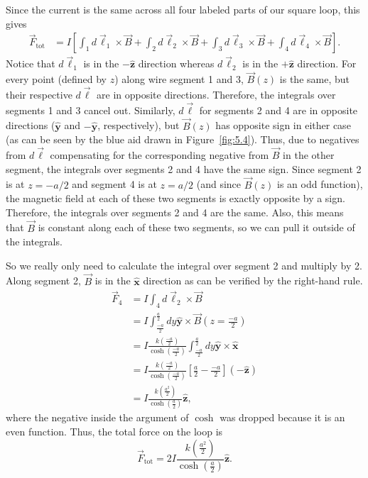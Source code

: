 \documentclass{article}
\newcommand{\xhat}{\hat{\textbf{x}}}
\newcommand{\yhat}{\hat{\textbf{y}}}
\newcommand{\zhat}{\hat{\textbf{z}}}
\begin{document}
Since the current is the same across all four labeled parts of our square loop, this gives
\begin{align}
	\vec{F}_\textrm{tot} &= I\left[ \int_1d\vec{\ell}_1\times\vec{B} + \int_2d\vec{\ell}_2\times\vec{B} + \int_3d\vec{\ell}_3\times\vec{B} + \int_4d\vec{\ell}_4\times\vec{B} \right].
\end{align}
Notice that $d\vec{\ell}_1$ is in the $-\zhat$ direction whereas $d\vec{\ell}_2$ is in the $+\zhat$ direction. For every point (defined by $z$) along wire segment 1 and 3, $\vec{B}(z)$ is the same, but their respective $d\vec{\ell}$ are in opposite directions. Therefore, the integrals over segments 1 and 3 cancel out. Similarly, $d\vec{\ell}$ for segments 2 and 4 are in opposite directions ($\yhat$ and $-\yhat$, respectively), but $\vec{B}(z)$ has opposite sign in either case (as can be seen by the blue aid drawn in Figure~\ref{fig:5.4}). Thus, due to negatives from $d\vec{\ell}$ compensating for the corresponding negative from $\vec{B}$ in the other segment, the integrals over segments 2 and 4 have the same sign. Since segment 2 is at $z=-a/2$ and segment 4 is at $z=a/2$ (and since $\vec{B}(z)$ is an odd function), the magnetic field at each of these two segments is exactly opposite by a sign. Therefore, the integrals over segments 2 and 4 are the same. Also, this means that $\vec{B}$ is constant along each of these two segments, so we can pull it outside of the integrals.

So we really only need to calculate the integral over segment 2 and multiply by 2. Along segment 2, $\vec{B}$ is in the $\xhat$ direction as can be verified by the right-hand rule.
\begin{align}
	\vec{F}_4 &= I \int_4d\vec{\ell}_2\times\vec{B} \\
	&= I \int_{\frac{-a}{2}}^{\frac{a}{2}}dy\yhat\times\vec{B}\left(z=\frac{-a}{2}\right) \\
	&= I \frac{k\left(\frac{-a}{2}\right)}{\cosh\left(\frac{-a}{2}\right)}\int_{\frac{-a}{2}}^{\frac{a}{2}}dy\yhat\times\xhat \\
	&= I \frac{k\left(\frac{-a}{2}\right)}{\cosh\left(\frac{-a}{2}\right)}\left[ \frac{a}{2} - \frac{-a}{2} \right](-\zhat) \\
	&= \boxed{I \frac{k\left(\frac{a^2}{2}\right)}{\cosh\left(\frac{a}{2}\right)}\zhat},
\end{align}
where the negative inside the argument of $\cosh$ was dropped because it is an even function. Thus, the total force on the loop is
\begin{equation}
	\boxed{\vec{F}_\textrm{tot} = 2I \frac{k\left(\frac{a^2}{2}\right)}{\cosh\left(\frac{a}{2}\right)}\zhat}.
\end{equation}
\end{document}
